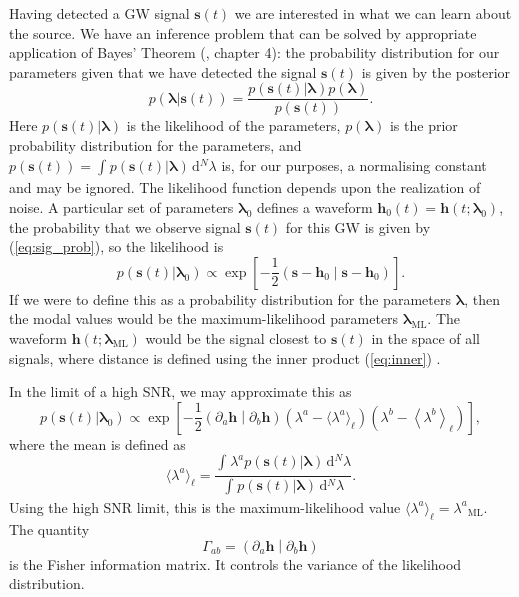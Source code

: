 \documentclass[useAMS,usedcolumn,usegraphicx,usenatbib]{mn2e}
\newcommand{\eqnref}[1]{(\ref{eq:#1})}
\newcommand{\sub}[1]{\ensuremath{_\mathrm{#1}}}
\newcommand{\dd}{\ensuremath{\mathrm{d}}}
\newcommand{\intd}[4]{\ensuremath{\int_{#1}^{#2}{#3}\,\dd{#4}}}
\newcommand{\recip}[1]{\ensuremath{\frac{1}{#1}}}
\newcommand{\innerprod}[2]{\ensuremath{\left({#1}\middle|{#2}\right)}}
\begin{document}
Having detected a GW signal $\boldsymbol{s}(t)$ we are interested in what we can learn about the source. We have an inference problem that can be solved by appropriate application of Bayes' Theorem (\citealt{Jaynes2003}, chapter 4): the probability distribution for our parameters given that we have detected the signal $\boldsymbol{s}(t)$ is given by the posterior
\begin{equation}
p(\boldsymbol{\lambda}|\boldsymbol{s}(t)) = \frac{p(\boldsymbol{s}(t)|\boldsymbol{\lambda})p(\boldsymbol{\lambda})}{p(\boldsymbol{s}(t))}.
\end{equation}
Here $p(\boldsymbol{s}(t)|\boldsymbol{\lambda})$ is the likelihood of the parameters, $p(\boldsymbol{\lambda})$ is the prior probability distribution for the parameters, and $p(\boldsymbol{s}(t)) = \intd{}{}{p(\boldsymbol{s}(t)|\boldsymbol{\lambda})}{^N \lambda}$ is, for our purposes, a normalising constant and may be ignored. The likelihood function depends upon the realization of noise. A particular set of parameters $\boldsymbol{\lambda}_0$ defines a waveform $\boldsymbol{h}_0(t) = \boldsymbol{h}(t; \boldsymbol{\lambda}_0)$, the probability that we observe signal $\boldsymbol{s}(t)$ for this GW is given by \eqnref{sig_prob}, so the likelihood is
\begin{equation}
p(\boldsymbol{s}(t)|\boldsymbol{\lambda}_0) \propto \exp\left[-\recip{2}\innerprod{\boldsymbol{s}-\boldsymbol{h}_0}{\boldsymbol{s}-\boldsymbol{h}_0}\right].
\end{equation}
If we were to define this as a probability distribution for the parameters $\boldsymbol{\lambda}$, then the modal values would be the maximum-likelihood parameters $\boldsymbol{\lambda}\sub{ML}$. The waveform $\boldsymbol{h}(t; \boldsymbol{\lambda}\sub{ML})$ would be the signal closest to $\boldsymbol{s}(t)$ in the space of all signals, where distance is defined using the inner product \eqnref{inner} \citep{Cutler1994}.

In the limit of a high SNR, we may approximate this as \citep{Vallisneri2008}
\begin{equation}
p(\boldsymbol{s}(t)|\boldsymbol{\lambda}_0) \propto \exp\left[-\recip{2}\innerprod{\partial_a\boldsymbol{h}}{\partial_b\boldsymbol{h}}\left(\lambda^a - \langle\lambda^a\rangle_\ell\right)\left(\lambda^b - \left\langle\lambda^b\right\rangle_\ell\right)\right],
\end{equation}
where the mean is defined as
\begin{equation}
\langle\lambda^a\rangle_\ell = \frac{\intd{}{}{\lambda^a p(\boldsymbol{s}(t)|\boldsymbol{\lambda})}{^N \lambda}}{\intd{}{}{p(\boldsymbol{s}(t)|\boldsymbol{\lambda})}{^N \lambda}}.
\end{equation}
Using the high SNR limit, this is the maximum-likelihood value $\langle\lambda^a\rangle_\ell = \lambda^a\sub{ML}$. The quantity
\begin{equation}
\Gamma_{ab} = \innerprod{\partial_a\boldsymbol{h}}{\partial_b\boldsymbol{h}}
\end{equation}
is the Fisher information matrix. It controls the variance of the likelihood distribution.
\end{document}
